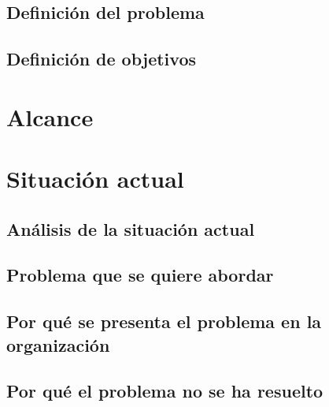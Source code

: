 \Blindtext

\subsection{Definición del problema}
\label{subsection:problema}

\Blindtext

\subsection{Definición de objetivos}
\label{subsection:objetivos}

\Blindtext

\section{Alcance}
\label{section:alcance}

\Blindtext

\section{Situación actual}
\label{section:situacion}

\Blindtext

\subsection{Análisis de la situación actual}
\label{subsection:analisis-situacion}

\Blindtext

\subsection{Problema que se quiere abordar}
\label{subsection:problema-situacion}

\Blindtext

\subsection{Por qué se presenta el problema en la organización}
\label{subsection:justificacion-situacion1}

\Blindtext

\subsection{Por qué el problema no se ha resuelto}
\label{subsection:justificacion-situacion2}

\Blindtext
